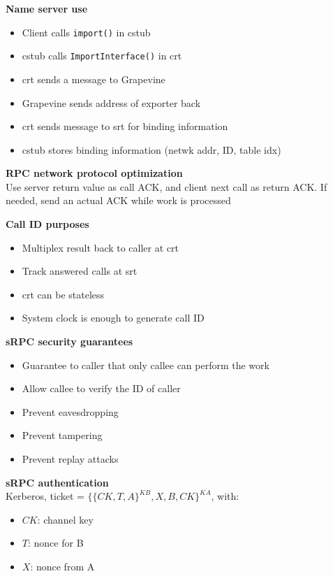 \documentclass[10pt,letterpaper,landscape]{report}
\newcommand{\boxheight}{21.59cm}
\newcommand{\boxwidth}{8.85cm}
\begin{document}
\begin{small}
{\begin{minipage}[t][\boxheight][c]{\boxwidth}
    \textbf{Name server use}
    \begin{itemize}
        \item Client calls \texttt{import()} in cstub
        \item cstub calls \texttt{ImportInterface()} in crt
        \item crt sends a message to Grapevine
        \item Grapevine sends address of exporter back
        \item crt sends message to srt for binding information
        \item cstub stores binding information (netwk addr, ID, table idx) 
    \end{itemize}
    
    \textbf{RPC network protocol optimization}\\
    Use server return value as call ACK, and client next call as return ACK. If needed, send an actual ACK while work is processed
    
    \textbf{Call ID purposes}
    \begin{itemize}
        \item Multiplex result back to caller at crt
        \item Track answered calls at srt
        \item crt can be stateless
        \item System clock is enough to generate call ID
    \end{itemize}
    
    \textbf{sRPC security guarantees}
    \begin{itemize}
        \item Guarantee to caller that only callee can perform the work
        \item Allow callee to verify the ID of caller
        \item Prevent eavesdropping
        \item Prevent tampering
        \item Prevent replay attacks
    \end{itemize}
    
    \textbf{sRPC authentication}\\
    Kerberos, ticket = $\{\{CK, T, A\}^{KB}, X, B, CK\}^{KA}$, with:
    \begin{itemize}
        \item $CK$: channel key
        \item $T$: nonce for B
        \item $X$: nonce from A
    \end{itemize}
    

\end{minipage}}
\end{small}
\end{document}
